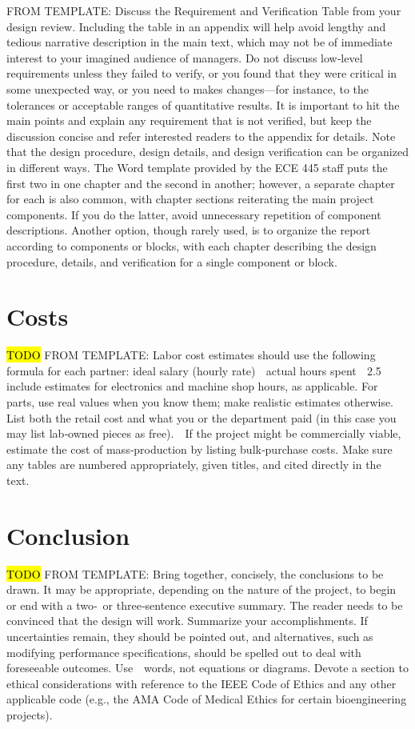 \documentclass[letterpaper,10pt]{article}
\begin{document}
\begin{spacing}{1.15}
FROM TEMPLATE: Discuss the Requirement and Verification Table from your design review. Including the table in an appendix will help avoid lengthy and tedious narrative description in the main text, which may not be of immediate interest to your imagined audience of managers. Do not discuss low‐level requirements unless they failed to verify, or you found that they were critical in some unexpected way, or you need to makes changes—for instance, to the tolerances or acceptable ranges of quantitative results. It is important to hit the main points and explain any requirement that is not verified, but keep the discussion concise and refer interested readers to the appendix for details. Note that the design procedure, design details, and design verification can be organized in different ways. The Word template provided by the ECE 445 staff puts the first two in one chapter and the second in another; however, a separate chapter for each is also common, with chapter sections reiterating the main project components. If you do the latter, avoid unnecessary repetition of component descriptions. Another option, though rarely used, is to organize the report according to components or blocks, with each chapter describing the design procedure, details, and verification for a single component or block.

\section{Costs}
\hl{TODO}
FROM TEMPLATE: Labor cost estimates should use the following formula for each partner:
ideal salary (hourly rate)  actual hours spent  2.5 include estimates for electronics and machine shop hours, as applicable. For parts, use real values when you know them; make realistic estimates otherwise. List both the retail cost and what you or the department paid (in this case you may list lab‐owned pieces as free).  If the project might be commercially viable, estimate the cost of mass‐production by listing bulk‐purchase costs. Make sure any tables are numbered appropriately, given titles, and cited directly in the text.  

\section{Conclusion}
\hl{TODO}
FROM TEMPLATE: Bring together, concisely, the conclusions to be drawn. It may be appropriate, depending on the nature of the project, to begin or end with a two‐ or three‐sentence executive summary. The reader needs to be convinced that the design will work. Summarize your accomplishments. If uncertainties remain, they should be pointed out, and alternatives, such as modifying performance specifications, should be spelled out to deal with foreseeable outcomes. Use  words, not equations or diagrams. Devote a section to ethical considerations with reference to the IEEE Code of Ethics and any other applicable code (e.g., the AMA Code of Medical Ethics for certain bioengineering projects).


\end{spacing}
\end{document}
